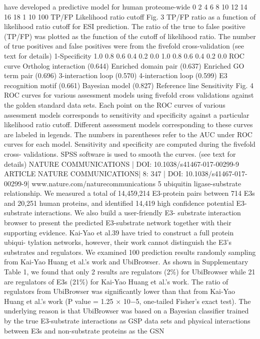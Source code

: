 have developed a predictive model for human proteome-wide
0
2
4
6
8
10
12
14
16
18
1
10
100
TP/FP
Likelihood ratio cutoff
Fig. 3 TP/FP ratio as a function of likelihood ratio cutoff for ESI prediction.
The ratio of the true to false positive (TP/FP) was plotted as the function of
the cutoff of likelihood ratio. The number of true positives and false
positives were from the ﬁvefold cross-validation (see text for details)
1-Specificity
1.0
0.8
0.6
0.4
0.2
0.0
1.0
0.8
0.6
0.4
0.2
0.0
ROC curve
Ortholog interaction (0.644)
Enriched domain pair (0.637)
Enriched GO term pair (0.696)
3-interaction loop (0.570)
4-interaction loop (0.599)
E3 recognition motif (0.661)
Bayesian model (0.827)
Reference line
Sensitivity
Fig. 4 ROC curves for various assessment models using ﬁvefold cross
validations against the golden standard data sets. Each point on the ROC
curves of various assessment models corresponds to sensitivity and
speciﬁcity against a particular likelihood ratio cutoff. Different assessment
models corresponding to these curves are labeled in legends. The numbers
in parentheses refer to the AUC under ROC curves for each model.
Sensitivity and speciﬁcity are computed during the ﬁvefold cross-
validations. SPSS software is used to smooth the curves. (see text for
details)
NATURE COMMUNICATIONS | DOI: 10.1038/s41467-017-00299-9
ARTICLE
NATURE COMMUNICATIONS| 8:  347
| DOI: 10.1038/s41467-017-00299-9| www.nature.com/naturecommunications
5
ubiquitin ligase-substrate relationship. We measured a total of
14,459,214 E3-protein pairs between 714 E3s and 20,251 human
proteins,
and
identiﬁed
14,419
high
conﬁdence
potential
E3-substrate interactions. We also build a user-friendly E3-
substrate
interaction
browser
to
present
the
predicted
E3-substrate network together with their supporting evidence.
Kai-Yao et al.39 have tried to construct a full protein ubiqui-
tylation networks, however, their work cannot distinguish the
E3’s substrates and regulators. We examined 100 prediction
results randomly sampling from Kai-Yao Huang et al.’s work and
UbiBrowser. As shown in Supplementary Table 1, we found that
only 2 results are regulators (2\%) for UbiBrowser while 21 are
regulators of E3s (21\%) for Kai-Yao Huang et al.’s work. The ratio
of regulators from UbiBrowser was signiﬁcantly lower than that
from Kai-Yao Huang et al.’s work (P value = 1.25 × 10−5,
one-tailed Fisher’s exact test). The underlying reason is that
UbiBrowser was based on a Bayesian classiﬁer trained by the true
E3-substrate
interactions
as
GSP
data
sets
and
physical
interactions between E3s and non-substrate proteins as the GSN
